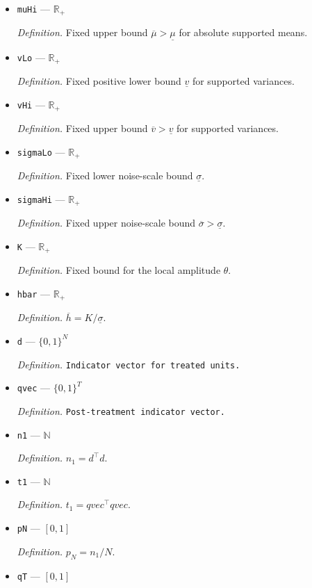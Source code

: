 \documentclass{article}
\begin{document}
\begin{itemize}
  \item \texttt{muHi} --- \(\mathbb R_{+}\)
  \par\smallskip\noindent\emph{Definition.} Fixed upper bound \(\overline\mu>\underline\mu\) for absolute supported means.
  \item \texttt{vLo} --- \(\mathbb R_{+}\)
  \par\smallskip\noindent\emph{Definition.} Fixed positive lower bound \(\underline v\) for supported variances.
  \item \texttt{vHi} --- \(\mathbb R_{+}\)
  \par\smallskip\noindent\emph{Definition.} Fixed upper bound \(\overline v>\underline v\) for supported variances.
  \item \texttt{sigmaLo} --- \(\mathbb R_{+}\)
  \par\smallskip\noindent\emph{Definition.} Fixed lower noise-scale bound \(\underline\sigma\).
  \item \texttt{sigmaHi} --- \(\mathbb R_{+}\)
  \par\smallskip\noindent\emph{Definition.} Fixed upper noise-scale bound \(\overline\sigma>\underline\sigma\).
  \item \texttt{K} --- \(\mathbb R_{+}\)
  \par\smallskip\noindent\emph{Definition.} Fixed bound for the local amplitude \(\theta\).
  \item \texttt{hbar} --- \(\mathbb R_{+}\)
  \par\smallskip\noindent\emph{Definition.} \(\overline h=K/\underline\sigma\).
  \item \texttt{d} --- \(\{0,1\}^{N}\)
  \par\smallskip\noindent\emph{Definition.} \texttt{Indicator vector for treated units.}
  \item \texttt{qvec} --- \(\{0,1\}^{T}\)
  \par\smallskip\noindent\emph{Definition.} \texttt{Post-\allowbreak{}treatment indicator vector.}
  \item \texttt{n1} --- \(\mathbb N\)
  \par\smallskip\noindent\emph{Definition.} \(n_1=d^{\top}d\).
  \item \texttt{t1} --- \(\mathbb N\)
  \par\smallskip\noindent\emph{Definition.} \(t_1=qvec^{\top}qvec\).
  \item \texttt{pN} --- \([0,1]\)
  \par\smallskip\noindent\emph{Definition.} \(p_N=n_1/N\).
  \item \texttt{qT} --- \([0,1]\)

\end{itemize}
\end{document}
